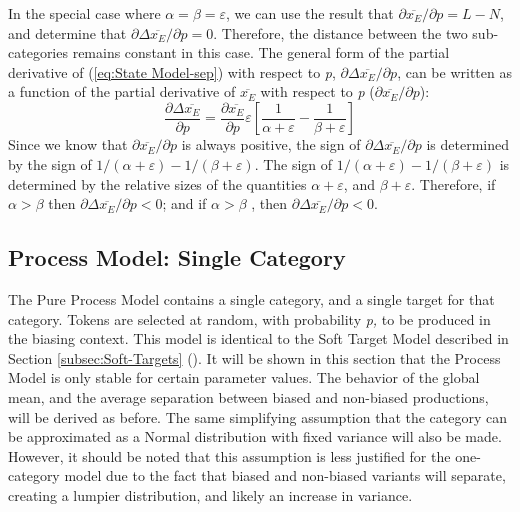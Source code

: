 In the special case where $\alpha=\beta=\varepsilon$, we can use
the result that ${\partial\overline{x_{E}}}/{\partial p}=L-N$,
and determine that ${\partial\Delta\overline{x_{E}}}/{\partial p}=0$.
Therefore, the distance between the two sub-categories remains constant
in this case. The general form of the partial derivative of (\ref{eq:State Model-sep})
with respect to \emph{p}, ${\partial\Delta\overline{x_{E}}}/{\partial p}$,
can be written as a function of the partial derivative of $\overline{x_{E}}$
with respect to \emph{p} (${\partial\overline{x_{E}}}/{\partial p}$):
\begin{equation}
\frac{\partial\Delta\overline{x_{E}}}{\partial p}=\frac{\partial\overline{x_{E}}}{\partial p}\varepsilon\left[\frac{1}{\alpha+\varepsilon}-\frac{1}{\beta+\varepsilon}\right]\label{eq: Model G: dsep/dp}
\end{equation}
Since we know that ${\partial\overline{x_{E}}}/{\partial p}$
is always positive, the sign of ${\partial\Delta\overline{x_{E}}}/{\partial p}$
is determined by the sign of ${1}/({\alpha+\varepsilon})-{1}/({\beta+\varepsilon})$.
The sign of ${1}/({\alpha+\varepsilon})-{1}/({\beta+\varepsilon})$
is determined by the relative sizes of the quantities $\alpha+\varepsilon$,
and $\beta+\varepsilon$. Therefore, if $\alpha>\beta$ then ${\partial\Delta\overline{x_{E}}}/{\partial p}<0$;
and if $\alpha>\beta$ , then ${\partial\Delta\overline{x_{E}}}/{\partial p}<0$.

\subsection{\label{subsec:Model-B:-Lengthening}Process Model: Single Category}

The Pure Process Model contains a single category, and a single target
for that category. Tokens are selected at random, with probability
\emph{p,} to be produced in the biasing context. This model is identical
to the Soft Target Model described in Section \ref{subsec:Soft-Targets}
(). It will be shown in this
section that the Process Model is only stable for certain parameter
values. The behavior of the global mean, and the average separation
between biased and non-biased productions, will be derived as before.
The same simplifying assumption that the category can be approximated
as a Normal distribution with fixed variance will also be made. However,
it should be noted that this assumption is less justified for the
one-category model due to the fact that biased and non-biased variants
will separate, creating a lumpier distribution, and likely an increase
in variance.

